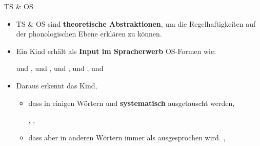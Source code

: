 \begin{frame}{TS \& OS}

\begin{itemize}
	\item TS \& OS sind \textbf{theoretische Abstraktionen},
              um die Regelhaftigkeiten auf der phonologischen Ebene erklären zu können.

\pause 

	\item Ein Kind erhält als \textbf{Input im Spracherwerb} OS-Formen wie: 
	
	\ea \textipa{[\textscr a:t]} und \textipa{[\textscr E:t@]}, \textipa{[\textscr a:t]} und \textipa{[\textscr E:d5]}, \textipa{[bEt]} und \textipa{[bEt@n]}, \textipa{[ba:t]} und \textipa{[bE:d5]}, \textipa{[kInt]} und \textipa{[kInd5]}
	\z 

\pause 

	\item Daraus erkennt das Kind,

	\begin{itemize}
		\item dass in einigen Wörtern \textipa{[d]} und \textipa{[t]} \textbf{systematisch} ausgetauscht werden,
		
		\ea  {}, , 
		\z 
		
		\item dass aber in anderen Wörtern \textipa{[t]} immer als \textipa{[t]} ausgesprochen wird.  
		\ea {}, 
		\z 
	\end{itemize}
		
\end{itemize}

\end{frame}


